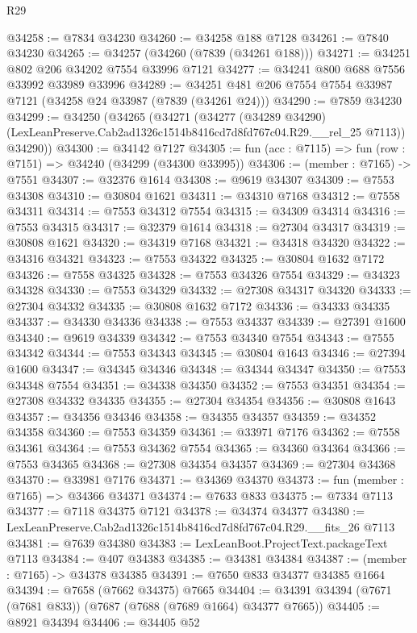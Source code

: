 \begin{lexlean}{R29}
\begin{coremodule}
@34258 := @7834 @34230
@34260 := @34258 @188 @7128
@34261 := @7840 @34230
@34265 := @34257 (@34260 (@7839 (@34261 @188)))
@34271 := @34251 @802 @206 @34202 @7554 @33996 @7121
@34277 := @34241 @800 @688 @7556 @33992 @33989 @33996
@34289 := @34251 @481 @206 @7554 @7554 @33987 @7121 (@34258 @24 @33987 (@7839 (@34261 @24)))
@34290 := @7859 @34230
@34299 := @34250
    (@34265
      (@34271
        (@34277
          (@34289 @34290)
          (LexLeanPreserve.Cab2ad1326c1514b8416cd7d8fd767c04.R29.__rel_25 @7113))
        @34290))
@34300 := @34142 @7127
@34305 := fun (acc : @7115) => fun (row : @7151) => @34240 (@34299 (@34300 @33995))
@34306 := (member : @7165) -> @7551
@34307 := @32376 @1614
@34308 := @9619 @34307
@34309 := @7553 @34308
@34310 := @30804 @1621
@34311 := @34310 @7168
@34312 := @7558 @34311
@34314 := @7553 @34312 @7554
@34315 := @34309 @34314
@34316 := @7553 @34315
@34317 := @32379 @1614
@34318 := @27304 @34317
@34319 := @30808 @1621
@34320 := @34319 @7168
@34321 := @34318 @34320
@34322 := @34316 @34321
@34323 := @7553 @34322
@34325 := @30804 @1632 @7172
@34326 := @7558 @34325
@34328 := @7553 @34326 @7554
@34329 := @34323 @34328
@34330 := @7553 @34329
@34332 := @27308 @34317 @34320
@34333 := @27304 @34332
@34335 := @30808 @1632 @7172
@34336 := @34333 @34335
@34337 := @34330 @34336
@34338 := @7553 @34337
@34339 := @27391 @1600
@34340 := @9619 @34339
@34342 := @7553 @34340 @7554
@34343 := @7555 @34342
@34344 := @7553 @34343
@34345 := @30804 @1643
@34346 := @27394 @1600
@34347 := @34345 @34346
@34348 := @34344 @34347
@34350 := @7553 @34348 @7554
@34351 := @34338 @34350
@34352 := @7553 @34351
@34354 := @27308 @34332 @34335
@34355 := @27304 @34354
@34356 := @30808 @1643
@34357 := @34356 @34346
@34358 := @34355 @34357
@34359 := @34352 @34358
@34360 := @7553 @34359
@34361 := @33971 @7176
@34362 := @7558 @34361
@34364 := @7553 @34362 @7554
@34365 := @34360 @34364
@34366 := @7553 @34365
@34368 := @27308 @34354 @34357
@34369 := @27304 @34368
@34370 := @33981 @7176
@34371 := @34369 @34370
@34373 := fun (member : @7165) => @34366 @34371
@34374 := @7633 @833
@34375 := @7334 @7113
@34377 := @7118 @34375 @7121
@34378 := @34374 @34377
@34380 := LexLeanPreserve.Cab2ad1326c1514b8416cd7d8fd767c04.R29.__fits_26 @7113
@34381 := @7639 @34380
@34383 := LexLeanBoot.ProjectText.packageText @7113
@34384 := @407 @34383
@34385 := @34381 @34384
@34387 := (member : @7165) -> @34378 @34385
@34391 := @7650 @833 @34377 @34385 @1664
@34394 := @7658 (@7662 @34375) @7665
@34404 := @34391 @34394 (@7671 (@7681 @833)) (@7687 (@7688 (@7689 @1664) @34377 @7665))
@34405 := @8921 @34394
@34406 := @34405 @52

\end{coremodule}
\end{lexlean}
